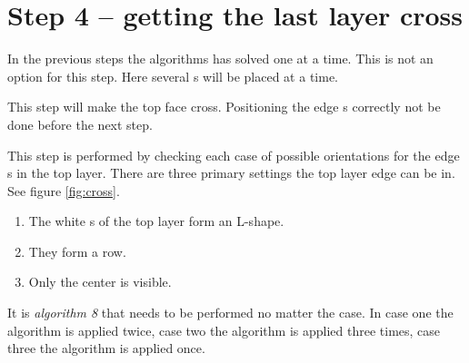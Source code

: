 \section{Step 4 --  getting the last layer cross}
In the previous steps the algorithms has solved one \cpiece{} at a time. 
This is not an option for this step. 
Here several \cpiece{}s will be placed at a time. 

This step will make the top face cross. 
Positioning the edge \cpiece{}s correctly not be done before the next step. 

This step is performed by checking each case of possible orientations for the edge \cpiece{}s in the top layer. 
There are three primary settings the top layer edge \cpiece{} can be in. See figure \ref{fig:cross}. 
\begin{enumerate}
\item The white \facelet{}s of the top layer form an L-shape.
\item They form a row.
\item Only the center \facelet{} is visible. 
\end{enumerate}
It is \textit{algorithm 8} that needs to be performed no matter the case. In case one the algorithm is applied twice, case two the algorithm is applied three times, case three the algorithm is applied once.